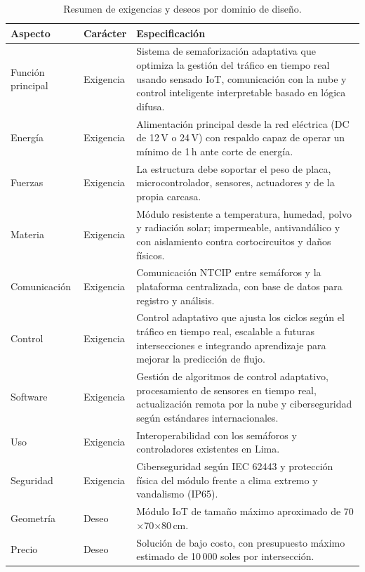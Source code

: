 \begin{table}[H]
  \centering
  \footnotesize
  \caption{Resumen de exigencias y deseos por dominio de diseño.}
  \label{tab:exigencias}
  \begin{tabularx}{\linewidth}{@{}>{\raggedright\arraybackslash}p{2.6cm}>{\raggedright\arraybackslash}p{1.9cm}>{\raggedright\arraybackslash}X@{}}
    \toprule
    \textbf{Aspecto} & \textbf{Carácter} & \textbf{Especificación}\\
    \midrule
    Función principal & Exigencia & Sistema de semaforización adaptativa que optimiza la gestión del tráfico en
    tiempo real usando sensado IoT, comunicación con la nube y control inteligente interpretable basado en
    lógica difusa.\\
    Energía & Exigencia & Alimentación principal desde la red eléctrica (DC de 12\,V o 24\,V) con respaldo
    capaz de operar un mínimo de 1\,h ante corte de energía.\\
    Fuerzas & Exigencia & La estructura debe soportar el peso de placa, microcontrolador, sensores, actuadores
    y de la propia carcasa.\\
    Materia & Exigencia & Módulo resistente a temperatura, humedad, polvo y radiación solar; impermeable,
    antivandálico y con aislamiento contra cortocircuitos y daños físicos.\\
    Comunicación & Exigencia & Comunicación NTCIP entre semáforos y la plataforma centralizada, con base de
    datos para registro y análisis.\\
    Control & Exigencia & Control adaptativo que ajusta los ciclos según el tráfico en tiempo real, escalable a
    futuras intersecciones e integrando aprendizaje para mejorar la predicción de flujo.\\
    Software & Exigencia & Gestión de algoritmos de control adaptativo, procesamiento de sensores en tiempo
    real, actualización remota por la nube y ciberseguridad según estándares internacionales.\\
    Uso & Exigencia & Interoperabilidad con los semáforos y controladores existentes en Lima.\\
    Seguridad & Exigencia & Ciberseguridad según IEC 62443 y protección física del módulo frente a clima
    extremo y vandalismo (IP65).\\
    Geometría & Deseo & Módulo IoT de tamaño máximo aproximado de 70$\times$70$\times$80\,cm.\\
    Precio & Deseo & Solución de bajo costo, con presupuesto máximo estimado de 10\,000 soles por intersección.\\
    \bottomrule
  \end{tabularx}
\end{table}

